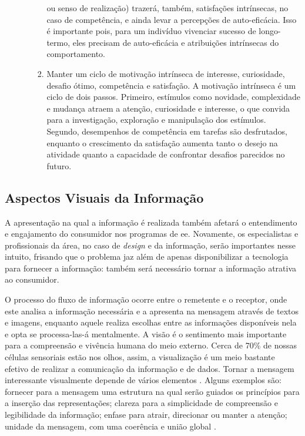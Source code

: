 \begin{itemize}
\begin{enumerate}
\begin{enumerate}
ou senso de realização) trazerá, também, satisfações intrínsecas, no caso de
competência, e ainda levar a percepções de auto-eficácia. Isso é
importante pois, para um indivíduo vivenciar sucesso de longo-termo, eles
precisam de auto-eficácia e atribuições intrínsecas do comportamento.
\item Manter um ciclo de motivação intrínseca de interesse, curiosidade, desafio
ótimo, competência e satisfação. A motivação intrínseca é um ciclo de dois
passos. Primeiro, estímulos como novidade, complexidade e mudança atraem a
atenção, curiosidade e interesse, o que convida para a investigação, exploração
e manipulação dos estímulos. Segundo, desempenhos de competência em tarefas são
desfrutados, enquanto o crescimento da satisfação aumenta tanto o desejo na
atividade quanto a capacidade de confrontar desafios parecidos no futuro.
\end{enumerate}
\end{enumerate}
\end{itemize}

\subsection{Aspectos Visuais da Informação}
\label{ssec:asp_visuais}

A apresentação na qual a informação é realizada também afetará o entendimento
e engajamento do consumidor nos programas de \gls{ee}. Novamente, os especialistas
e profissionais da área, no caso de \emph{design} e da informação,
serão importantes nesse intuito, frisando que o problema jaz além de
apenas disponibilizar a tecnologia para fornecer a informação: também
será necessário tornar a informação atrativa ao consumidor.

O processo do fluxo de informação ocorre entre o remetente e o
receptor, onde este analisa a informação necessária e a apresenta na
mensagem através de textos e imagens, enquanto aquele realiza escolhas
entre as informações disponíveis nela e opta se processa-las-á
mentalmente. A visão é o sentimento mais importante para a compreensão
e vivência humana do meio externo.  Cerca de 70\% de nossas células
sensoriais estão nos olhos, assim, a visualização é um meio bastante
efetivo de realizar a comunicação da informação e de dados.  Tornar a
mensagem interessante visualmente depende de vários elementos
\cite{2012_visualisation_sweden}. Alguns exemplos são: fornecer para a
mensagem uma estrutura na qual serão guiados os princípios para a
inserção das representações; clareza para a simplicidade de
compreensão e legibilidade da informação; enfase para atrair,
direcionar ou manter a atenção; unidade da mensagem, com uma coerência
e união global \cite{it_depends}.

